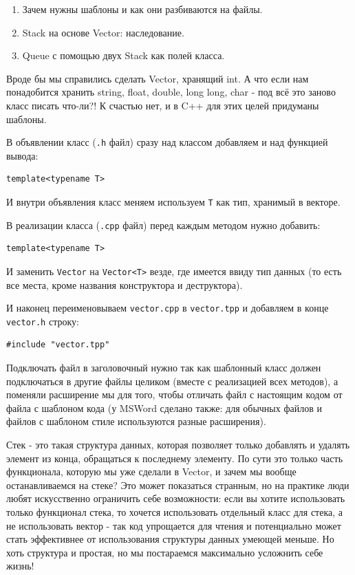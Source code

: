\label{md2tex4}
\hyperref[md2texREADME]{\color{cyan}{К главному описанию}}


\begin{enumerate}
    \item Зачем нужны шаблоны и как они разбиваются на файлы.
    \item Stack на основе Vector: наследование.
    \item Queue с помощью двух Stack как полей класса.
\end{enumerate}


Вроде бы мы справились сделать Vector, хранящий int. А что если нам понадобится хранить string, float, double, long long, char - под всё это заново класс писать что-ли?! К счастью нет, и в C++ для этих целей придуманы шаблоны.


В объявлении класс (\texttt{.h} файл) сразу над классом добавляем и над функцией вывода:
\begin{verbatim}
template<typename T>
\end{verbatim}
И внутри объявления класс меняем используем \texttt{T} как тип, хранимый в векторе.

В реализации класса (\texttt{.cpp} файл) перед каждым методом нужно добавить:
\begin{verbatim}
template<typename T>
\end{verbatim}
И заменить \texttt{Vector} на \texttt{Vector<T>} везде, где имеется ввиду тип данных (то есть все места, кроме названия конструктора и деструктора).

И наконец переименовываем \texttt{vector.cpp} в \texttt{vector.tpp} и добавляем в конце \texttt{vector.h} строку:
\begin{verbatim}
#include "vector.tpp"
\end{verbatim}
Подключать файл в заголовочный нужно так как шаблонный класс должен подключаться в другие файлы целиком (вместе с реализацией всех методов), а поменяли расширение мы для того, чтобы отличать файл с настоящим кодом от файла с шаблоном кода (у MSWord сделано также: для обычных файлов и файлов с шаблоном стиле используются разные расширения).


Стек - это такая структура данных, которая позволяет только добавлять и удалять элемент из конца, обращаться к последнему элементу. По сути это только часть функционала, которую мы уже сделали в Vector, и зачем мы вообще останавливаемся на стеке? Это может показаться странным, но на практике люди любят искусственно ограничить себе возможности: если вы хотите использовать только функционал стека, то хочется использовать отдельный класс для стека, а не использовать вектор - так код упрощается для чтения и потенциально может стать эффективнее от использования структуры данных умеющей меньше. Но хоть структура и простая, но мы постараемся максимально усложнить себе жизнь!

